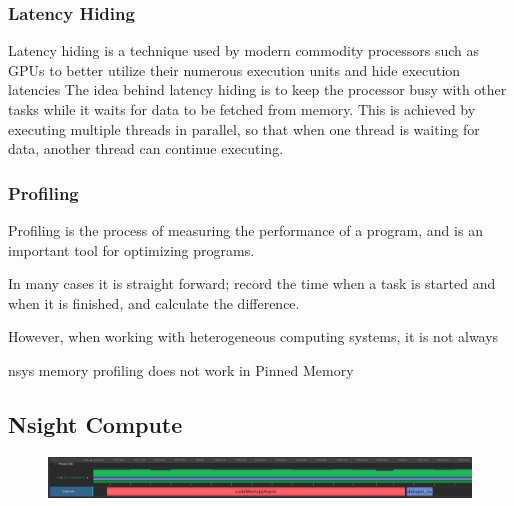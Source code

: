 \subsubsection{Latency Hiding}
Latency hiding is a technique used by modern commodity processors such as GPUs to better utilize their numerous execution units and hide execution latencies \cite[35]{volkovLatencyHiding2016}
The idea behind latency hiding is to keep the processor busy with other tasks while it waits for data to be fetched from memory.
This is achieved by executing multiple threads in parallel, so that when one thread is waiting for data, another thread can continue executing.


\subsubsection{Profiling}
Profiling is the process of measuring the performance of a program, and is an important tool for optimizing programs.

In many cases it is straight forward; record the time when a task is started and when it is finished, and calculate the difference.


However, when working with heterogeneous computing systems, it is not always

nsys memory profiling does not work in Pinned Memory

\subsection{Nsight Compute}
\begin{figure}[H]
    \centering
    \includegraphics[width=\textwidth]{figures/memory_comparaison.png}
\end{figure}

